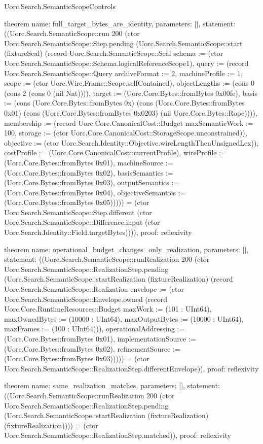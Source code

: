\begin{lexlean}{Uorc.Search.SemanticScopeControls}
\begin{semanticmodule}
theorem{
  name: full_target_bytes_are_identity,
  parameters: [],
  statement: ((Uorc.Search.SemanticScope::run 200 (ctor Uorc.Search.SemanticScope::Step.pending (Uorc.Search.SemanticScope::start (fixtureSeal) (record Uorc.Search.SemanticScope::Seal {schema := (ctor Uorc.Search.SemanticScope::Schema.logicalReferenceScope1), query := (record Uorc.Search.SemanticScope::Query {archiveFormat := 2, machineProfile := 1, scope := (ctor Uorc.Wire.Frame::Scope.selfContained), objectLengths := (cons 0 (cons 2 (cons 0 (nil Nat)))), target := (Uorc.Core.Bytes::fromBytes 0x00fe), basis := (cons (Uorc.Core.Bytes::fromBytes 0x) (cons (Uorc.Core.Bytes::fromBytes 0x01) (cons (Uorc.Core.Bytes::fromBytes 0x0203) (nil Uorc.Core.Bytes::Rope)))), membership := (record Uorc.Core.CanonicalCost::Budget {maxSemanticWork := 100, storage := (ctor Uorc.Core.CanonicalCost::StorageScope.unconstrained)}), objective := (ctor Uorc.Search.Identity::Objective.wireLengthThenUnsignedLex)}), costProfile := (Uorc.Core.CanonicalCost::currentProfile), wireProfile := (Uorc.Core.Bytes::fromBytes 0x01), machineSource := (Uorc.Core.Bytes::fromBytes 0x02), basisSemantics := (Uorc.Core.Bytes::fromBytes 0x03), outputSemantics := (Uorc.Core.Bytes::fromBytes 0x04), objectiveSemantics := (Uorc.Core.Bytes::fromBytes 0x05)})))) = (ctor Uorc.Search.SemanticScope::Step.different (ctor Uorc.Search.SemanticScope::Difference.input (ctor Uorc.Search.Identity::Field.targetBytes)))),
  proof: reflexivity{}
}

theorem{
  name: operational_budget_changes_only_realization,
  parameters: [],
  statement: ((Uorc.Search.SemanticScope::runRealization 200 (ctor Uorc.Search.SemanticScope::RealizationStep.pending (Uorc.Search.SemanticScope::startRealization (fixtureRealization) (record Uorc.Search.SemanticScope::Realization {envelope := (ctor Uorc.Search.SemanticScope::Envelope.owned (record Uorc.Core.RuntimeResources::Budget {maxWork := (101 : UInt64), maxOwnedBytes := (10000 : UInt64), maxOutputBytes := (10000 : UInt64), maxFrames := (100 : UInt64)})), operationalAddressing := (Uorc.Core.Bytes::fromBytes 0x01), implementationSource := (Uorc.Core.Bytes::fromBytes 0x02), refinementSource := (Uorc.Core.Bytes::fromBytes 0x03)})))) = (ctor Uorc.Search.SemanticScope::RealizationStep.differentEnvelope)),
  proof: reflexivity{}
}

theorem{
  name: same_realization_matches,
  parameters: [],
  statement: ((Uorc.Search.SemanticScope::runRealization 200 (ctor Uorc.Search.SemanticScope::RealizationStep.pending (Uorc.Search.SemanticScope::startRealization (fixtureRealization) (fixtureRealization)))) = (ctor Uorc.Search.SemanticScope::RealizationStep.matched)),
  proof: reflexivity{}
}


\end{semanticmodule}
\end{lexlean}
